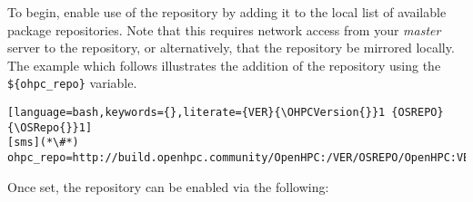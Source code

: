 To begin, enable use of the \OHPC{} repository by adding it to the local list
of available package repositories.  Note that this requires network access from
your {\em master} server to the \OHPC{} repository, or alternatively, that
the \OHPC{} repository be mirrored locally. The example which follows
illustrates the addition of the \OHPC{} repository using
the \texttt{\$\{ohpc\_repo\}} variable.

\begin{lstlisting}[language=bash,keywords={},literate={VER}{\OHPCVersion{}}1 {OSREPO}{\OSRepo{}}1]
[sms](*\#*) ohpc_repo=http://build.openhpc.community/OpenHPC:/VER/OSREPO/OpenHPC:VER.repo
\end{lstlisting}

\noindent Once set, the repository can be enabled via the following: 






